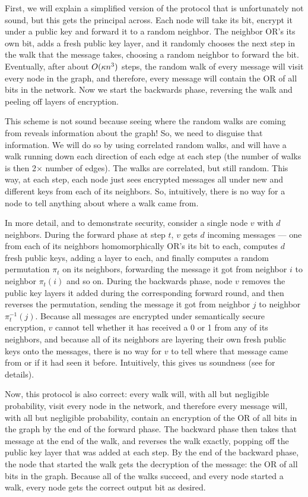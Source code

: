 First, we will explain a simplified version of the protocol that is unfortunately not sound, but this gets the principal across. Each node will take its bit, encrypt it under a public key and forward it to a random neighbor. The neighbor OR's its own bit, adds a fresh public key layer, and it randomly chooses the next step in the walk that the message takes, choosing a random neighbor to forward the bit. Eventually, after about $O(\kappa n^3)$ steps, the random walk of every message will visit every node in the graph, and therefore, every message will contain the OR of all bits in the network. Now we start the backwards phase, reversing the walk and peeling off layers of encryption.

This scheme is not sound because seeing where the random walks are coming from reveals information about the graph! So, we need to disguise that information. We will do so by using correlated random walks, and will have a walk running down each direction of each edge at each step (the number of walks is then 2$\times$ number of edges). The walks are correlated, but still random. This way, at each step, each node just sees encrypted messages all under new and different keys from each of its neighbors. So, intuitively, there is no way for a node to tell anything about where a walk came from.

In more detail, and to demonstrate security, consider a single node $v$ with $d$ neighbors. During the forward phase at step $t$, $v$ gets $d$ incoming messages --- one from each of its neighbors
homomorphically OR's its bit to each, computes $d$ fresh public keys, adding a layer to each, and finally computes a random permutation $\pi_t$ on its neighbors, forwarding the message it got from neighbor $i$ to neighbor $\pi_t(i)$ and so on. During the backwards phase, node $v$ removes the public key layers it added during the corresponding forward round, and then reverses the permutation, sending the message it got from neighbor $j$ to neighbor $\pi_t^{-1}(j)$. Because all messages are encrypted under semantically secure encryption, $v$ cannot tell whether it has received a 0 or 1 from any of its neighbors, and because all of its neighbors are layering their own fresh public keys onto the messages, there is no way for $v$ to tell where that message came from or if it had seen it before. Intuitively, this gives us soundness (see \cite{C:AkaLaVMor17} for details).

Now, this protocol is also correct: every walk will, with all but negligible probability, visit every node in the network, and therefore every message will, with all but negligible probability, contain an encryption of the OR of all bits in the graph by the end of the forward phase. The backward phase then takes that message at the end of the walk, and reverses the walk exactly, popping off the public key layer that was added at each step. By the end of the backward phase, the node that started the walk gets the decryption of the message: the OR of all bits in the graph. Because all of the walks succeed, and every node started a walk, every node gets the correct output bit as desired.


